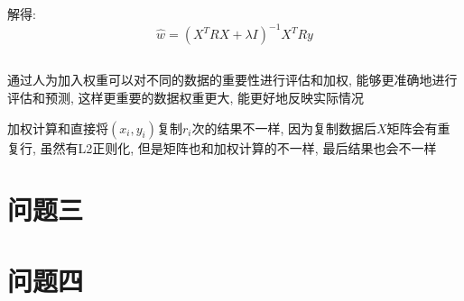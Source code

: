 \documentclass[12pt, a4paper]{article}
\begin{document}
解得:
\begin{equation*}
    \hat{w} = (X^T R X + \lambda I)^{-1} X^T R y
\end{equation*}

\subsection{}

通过人为加入权重可以对不同的数据的重要性进行评估和加权, 能够更准确地进行评估和预测, 
这样更重要的数据权重更大, 能更好地反映实际情况

加权计算和直接将$(x_i,y_i)$复制$r_i$次的结果不一样, 因为复制数据后$X$矩阵会有重复行, 
虽然有L2正则化, 但是矩阵也和加权计算的不一样, 最后结果也会不一样

\section{问题三}


\subsection{}



\subsection{}



\section{问题四}

\subsection{}
\end{document}
